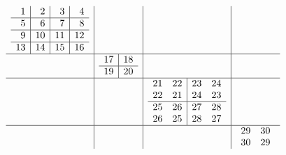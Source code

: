 \documentclass[11pt,a4paper]{amsart}
\begin{document}
\begin{align*}
  \begin{array}{c|c|c|c}
    \begin{array}{r|r|r|r}
      1&2&3&4\\\hline
      5&6&7&8\\\hline
      9&10&11&12\\\hline
      13&14&15&16\\
    \end{array}
       &&& \\\hline
    &
         \begin{array}{r|r}
           17&18\\\hline
           19&20\\
         \end{array}
         && \\\hline
       &&
          \begin{array}{rr|rr}
            21&22&23&24\\
            22&21&24&23\\\hline
            25&26&27&28\\
            26&25&28&27\\
          \end{array}
         & \\\hline
       &&&
           \begin{array}{rr}
             29&30\\
             30&29\\
           \end{array}
    \\
  \end{array}
\end{align*}
\end{document}
